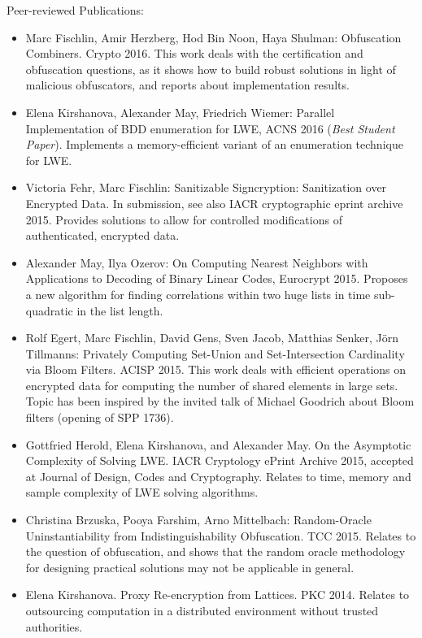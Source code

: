 \noindent
Peer-reviewed Publications:
\vspace*{-0.5cm}
\begin{itemize}
 \item   Marc Fischlin, Amir Herzberg, Hod Bin Noon, Haya Shulman:
Obfuscation Combiners. Crypto 2016. This work deals with the certification and obfuscation questions, as it shows how to build robust solutions in light of malicious obfuscators, and reports about implementation results.
%
\item Elena Kirshanova, Alexander May, Friedrich Wiemer: Parallel Implementation of BDD enumeration for LWE, ACNS 2016 ({\em Best Student Paper}). Implements a memory-efficient variant of an enumeration technique for LWE.
%
\item 
Victoria Fehr, Marc Fischlin:
Sanitizable Signcryption: Sanitization over Encrypted Data. In submission, see also IACR cryptographic eprint archive 2015. Provides solutions to allow for controlled modifications of authenticated, encrypted data.
%
\item Alexander May, Ilya Ozerov: On Computing Nearest Neighbors with Applications to Decoding of Binary Linear Codes, Eurocrypt 2015. Proposes a new algorithm for finding correlations within two huge lists in time sub-quadratic in the list length.  
%
\item Rolf Egert, Marc Fischlin, David Gens, Sven Jacob, Matthias Senker, J\"orn Tillmanns: Privately Computing Set-Union and Set-Intersection Cardinality via Bloom Filters. ACISP 2015. This work deals with efficient operations on encrypted data for computing the number of shared elements in large sets. Topic has been inspired by the invited talk of Michael Goodrich about Bloom filters (opening of SPP 1736).
%
\item Gottfried Herold, Elena Kirshanova, and Alexander May. On the Asymptotic Complexity of Solving LWE. IACR Cryptology ePrint Archive 2015, accepted at Journal of Design, Codes and Cryptography. Relates to time, memory and sample complexity of LWE solving algorithms.
%
\item Christina Brzuska, Pooya Farshim, Arno Mittelbach:
Random-Oracle Uninstantiability from Indistinguishability Obfuscation. TCC 2015. Relates to the question of obfuscation, and shows that the random oracle methodology for designing practical solutions may not be applicable in general.
%
\item Elena Kirshanova. Proxy Re-encryption from Lattices.  PKC 2014. Relates to outsourcing computation in a distributed environment without trusted authorities.

\end{itemize}
